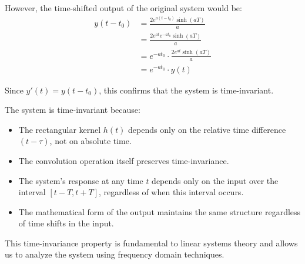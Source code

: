 However, the time-shifted output of the original system would be:
\begin{align}
y(t-t_0) &= \frac{2e^{a(t-t_0)}\sinh(aT)}{a} \\
&= \frac{2e^{at}e^{-at_0}\sinh(aT)}{a} \\
&= e^{-at_0} \cdot \frac{2e^{at}\sinh(aT)}{a} \\
&= e^{-at_0} \cdot y(t)
\end{align}

Since $y'(t) = y(t-t_0)$, this confirms that the system is time-invariant.

The system is time-invariant because:
\begin{itemize}
    \item The rectangular kernel $h(t)$ depends only on the relative time difference $(t-\tau)$, not on absolute time.
    \item The convolution operation itself preserves time-invariance.
    \item The system's response at any time $t$ depends only on the input over the interval $[t-T, t+T]$, regardless of when this interval occurs.
    \item The mathematical form of the output maintains the same structure regardless of time shifts in the input.
\end{itemize}

This time-invariance property is fundamental to linear systems theory and allows us to analyze the system using frequency domain techniques.
